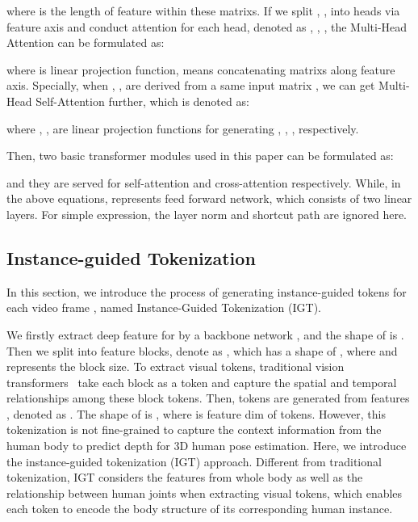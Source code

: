 \documentclass[sigconf]{acmart}
\begin{document}
where  is the length of feature within these matrixs. If we split , ,  into  heads via feature axis and conduct attention for each head, denoted as , , , the Multi-Head Attention  can be formulated as:

where  is linear projection function,  means concatenating matrixs along feature axis. Specially, when , ,  are derived from a same input matrix , we can get Multi-Head Self-Attention  further, which is denoted as:

where , ,  are linear projection functions for generating , , , respectively.

Then, two basic transformer modules used in this paper can be formulated as:

and they are served for self-attention and cross-attention respectively. While, in the above equations,  represents feed forward network, which consists of two linear layers. For simple expression, the layer norm and shortcut path are ignored here.

\subsection{Instance-guided Tokenization}

In this section, we introduce the process of generating instance-guided tokens for each video frame , named Instance-Guided Tokenization (IGT).

We firstly extract deep feature  for  by a backbone network , and the shape of  is . 
Then we split  into  feature blocks, denote as , which has a shape of , where  and  represents the block size. 
To extract visual tokens, traditional vision transformers~\cite{dosovitskiy2020image,bertasius2021space} take each block as a token and capture the spatial and temporal relationships among these block tokens. Then,  tokens are generated from features , denoted as . The shape of  is , where  is feature dim of tokens. However, this tokenization is not fine-grained to capture the context information from the human body to predict depth for 3D human pose estimation. 
Here, we introduce the instance-guided tokenization (IGT) approach. Different from traditional tokenization, IGT considers the features from whole body as well as the relationship between human joints when extracting visual tokens, which enables each token to encode the body structure of its corresponding human instance.
\end{document}
